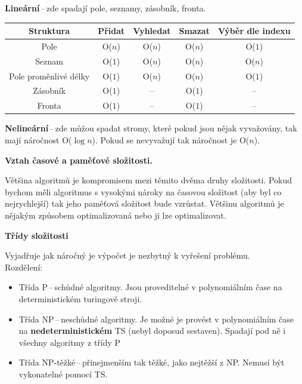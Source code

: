 \textbf{Lineární}\,--\,zde spadají pole, seznamy, zásobník, fronta.
\begin{table}[h]
    \centering
    \begin{tabular}{|c|c|c|c|c|}\hline
         Struktura & Přidat & Vyhledat & Smazat & Výběr dle indexu\\\hline
         Pole & O($n$) & O($n$) & O($n$) & O($1$) \\\hline
         Seznam & O($1$) & O($n$) & O($n$) & O($n$)\\\hline
         Pole proměnlivé délky & O($1$) & O($n$) & O($n$) & O($1$) \\\hline
         Zásobník & O($1$) & -- & O($1$) & -- \\\hline
         Fronta & O($1$) & -- & O($1$) & -- \\\hline
    \end{tabular}
\end{table}

\textbf{Nelineární}\,--\,zde můžou spadat stromy, které pokud jsou nějak vyvažovány, tak mají náročnost O($\log{n}$). Pokud se nevyvažují tak náročnost je O($n$).

\begin{Large}\vspace{0,5cm} \textbf{Vztah časové a paměťové složitosti.}
\end{Large}

Většina algoritmů je kompromisem mezi těmito dvěma druhy složitosti. Pokud bychom měli algoritmus s vysokými nároky na časovou složitost (aby byl co nejrychlejší) tak jeho paměťová složitost bude vzrůstat. Většinu algoritmů je nějakým způsobem optimalizovaná nebo ji lze optimalizovat.

\begin{Large}\vspace{0,5cm} \textbf{Třídy složitosti}
\end{Large}

Vyjadřuje jak náročný je výpočet je nezbytný k vyřešení problému.\\
Rozdělení:
\begin{itemize}
    \item Třída P\,--\,schůdné algoritmy. Jsou proveditelné v polynomiálním čase na deterministickém turingově stroji.
    \item Třída NP\,--\,neschůdné algoritmy. Je možné je provést v polynomiálním čase na \textbf{nedeterministickém} TS (nebyl doposud sestaven). Spadají pod ně i všechny algoritmy z třídy P
    \item Třída NP-těžké\,--\,přinejmenším tak těžké, jako nejtěžší z NP. Nemusí být vykonatelné pomocí TS.
\end{itemize}









